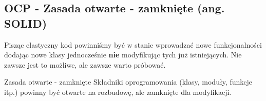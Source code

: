 
\subsection{OCP - Zasada otwarte - zamknięte (ang. S\textbf{O}LID)}\label{lab1/sec/ocpPrinciple}

Pisząc elastyczny kod powinniśmy być w stanie wprowadzać nowe funkcjonalności dodając nowe klasy jednocześnie \textbf{nie} modyfikując tych już istniejących. Nie zawsze jest to możliwe, ale zawsze warto próbować. 

\begin{myboxWithTitle}{Zasada otwarte - zamknięte}
Składniki oprogramowania (klasy, moduły, funkcje itp.) powinny być otwarte na rozbudowę, ale zamknięte dla modyfikacji.
\end{myboxWithTitle}

